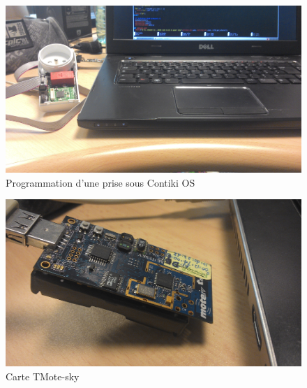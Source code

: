 \documentclass{article}
\begin{document}
\begin{figure}[h]
	\begin{center}
		\includegraphics[scale=0.1]{../res/img/progprise.jpg}
		\caption{Programmation d'une prise sous Contiki OS}
		\label{fig:progprise}
	\end{center}
\end{figure}
\begin{figure}[h]
	\begin{center}
		\includegraphics[scale=0.1]{../res/img/tmote.jpg}
		\caption{Carte TMote-sky}
		\label{fig:tmotesky}
	\end{center}
\end{figure}
\end{document}
